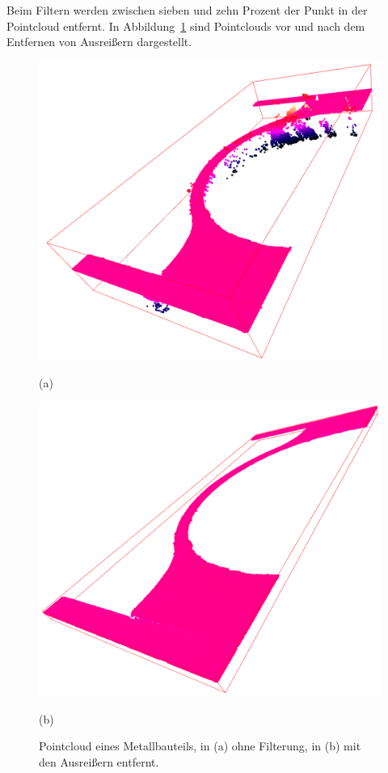 Beim Filtern werden zwischen sieben und zehn Prozent der Punkt in der Pointcloud entfernt.
In Abbildung~\ref{fig:pcs} sind Pointclouds vor und nach dem Entfernen von Ausreißern 
dargestellt.

\begin{figure}[H]
    \centering
    \begin{minipage}{0.45\textwidth}
        \centering
        \includegraphics[width=\textwidth]{images/pc_with_outliers.PNG} %
        \caption*{(a)}
    \end{minipage}\hfill
    \begin{minipage}{0.45\textwidth}
        \centering
        \includegraphics[width=\textwidth]{images/pc_without_outliers.PNG} %
        \caption*{(b)}
    \end{minipage}
    \caption{Pointcloud eines Metallbauteils, in (a) ohne Filterung,
    in (b) mit den Ausreißern entfernt.}
    \label{fig:pcs}
\end{figure}

